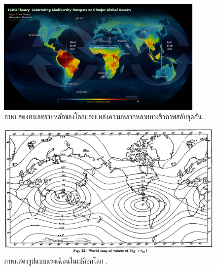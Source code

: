 \documentclass[10pt,twocolumn,letterpaper]{article}
\begin{document}
\begin{figure}[t]
\begin{center}
\includegraphics[width=0.9\textwidth]{biodiversity.jpg}
\end{center}
   \caption{ภาพแสดงทะเลทรายหลักของโลกและแหล่งความหลากหลายทางชีวภาพสลับจุดกัน \cite{28}.}
\label{fig:9}
\end{figure}

\begin{figure}[t]
\begin{center}
   \includegraphics[width=1\linewidth]{meinesz3.jpg}
\end{center}
   \caption{ภาพแสดงรูปแบบแรงเฉือนในเปลือกโลก \cite{36}.}
\label{fig:8}

\label{fig:onecol}
\end{figure}
\end{document}
